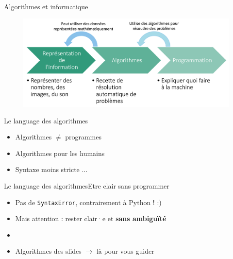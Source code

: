 \documentclass{beamer}
\begin{document}
\begin{frame}{Algorithmes et informatique}{}
	\begin{figure}
		\includegraphics[width=1\linewidth]{algo_et_info.png}
	\end{figure}
\end{frame}


\begin{frame}{Le language des algorithmes}

	\begin{itemize}
		\item Algorithmes $\neq$ programmes
		\item<2-> Algorithmes pour les humains
		\item<3-> Syntaxe moins stricte ...
	\end{itemize}

\end{frame}

\begin{frame}{Le language des algorithmes}{Etre clair sans programmer}

	\begin{itemize}
		\item Pas de \texttt{SyntaxError}, contrairement à Python ! :)
		\item<2-> Mais attention : rester clair·e et \textbf{sans ambiguïté}
		\item<3-> \href{https://youtu.be/KY2z0YSw0Lk?t=12}{}
		\item<4-> Algorithmes des slides $\rightarrow$ là pour vous guider
	\end{itemize}

\end{frame}
\end{document}
